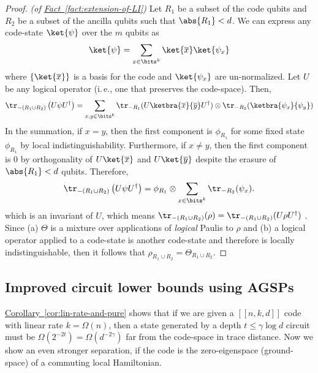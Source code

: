 \documentclass[11pt]{article}
\newcommand{\expref}[2]{\texorpdfstring{\hyperref[#2]{#1~\ref{#2}}}{#1~\ref{#2}}}
\newcommand{\ie}{i.\,e.}
\begin{document}
\begin{proof}
\textit{(of \expref{Fact}{fact:extension-of-LI})}
Let $R_1$ be a subset of the code qubits and $R_2$ be a subset of the ancilla qubits such that $\abs{R_1} < d$. We can express any code-state $\ket{\psi}$ over the $m$ qubits as
\begin{align}
    \ket{\psi} = \sum_{x \in \bits^k} \ket{\overline{x}} \ket{\psi_x}
\end{align}
where $\{\ket{\overline{x}}\}$ is a basis for the code and $\ket{\psi_x}$ are un-normalized. Let $U$ be any logical operator (\ie, one that preserves the code-space). Then,
\begin{align}
\tr_{-(R_1 \cup R_2)}\left(U \psi U^\dagger\right) = \sum_{x,y \in \bits^k} \tr_{-R_1}(U \ketbra{\overline{x}}{\overline{y}} U^\dagger) \otimes \tr_{-R_2} (\ketbra{\psi_x}{\psi_y})
\end{align}
In the summation, if $x = y$, then the first component is $\phi_{R_1}$ for some fixed state $\phi_{R_1}$ by local indistinguishability. Furthermore, if $x \neq y$, then the first component is $0$ by orthogonality of $U\ket{\overline{x}}$ and $U\ket{\overline{y}}$ despite the erasure of $\abs{R_1} < d$ qubits. Therefore,
\begin{align}
    \tr_{-(R_1 \cup R_2)} \left(U \psi U^\dagger \right) = \phi_{R_1} \otimes \sum_{x \in \bits^k}  \tr_{-R_2}(\psi_x).
\end{align}
which is an invariant of $U$, which means $\tr_{-(R_1 \cup R_2)}(\rho) = \tr_{-(R_1 \cup R_2)}(U \rho U^\dagger)$ . Since (a) $\Theta$ is a mixture over applications of \emph{logical} Paulis to $\rho$ and (b) a logical operator applied to a code-state is another code-state and therefore is locally indistinguishable, then it follows that $\rho_{R_1 \cup R_2} = \Theta_{R_1 \cup R_2}$.
\end{proof}

\subsection{Improved circuit lower bounds using AGSPs}

\expref{Corollary}{cor:lin-rate-and-pure} shows that if we are given a $[[n,k,d]]$ code with linear rate $k=\Omega(n)$, then a state generated by a depth $t \leq \gamma\log d$ circuit must be $\Omega\left(2^{-2t}\right)=\Omega\left(d^{-2\gamma}\right)$ far from the code-space in trace distance. Now we show an even stronger separation, if the code is the zero-eigenspace (ground-space) of a commuting local Hamiltonian. 
\end{document}
